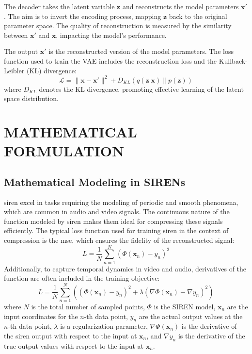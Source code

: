 \documentclass{ioereport}
\begin{document}
    The decoder takes the latent variable $\mathbf{z}$ and reconstructs the model parameters $\mathbf{x'}$. The aim is to invert the encoding process, mapping $\mathbf{z}$ back to the original parameter space. The quality of reconstruction is measured by the similarity between $\mathbf{x'}$ and $\mathbf{x}$, impacting the model's performance.

    The output $\mathbf{x'}$ is the reconstructed version of the model parameters. The loss function used to train the VAE includes the reconstruction loss and the Kullback-Leibler (KL) divergence:
    \begin{equation}
    \mathcal{L} = \|\mathbf{x} - \mathbf{x'}\|^2 + D_{KL}(q(\mathbf{z}|\mathbf{x}) \| p(\mathbf{z}))
    \end{equation}
    where $D_{KL}$ denotes the KL divergence, promoting effective learning of the latent space distribution.

\pagebreak



\section{\MakeUppercase{Mathematical Formulation}}

\subsection{Mathematical Modeling in SIRENs}
\gls{siren} excel in tasks requiring the modeling of periodic and smooth phenomena, which are common in audio and video signals. The continuous nature of the function modeled by \gls{siren} makes them ideal for compressing these signals efficiently. The typical loss function used for training \gls{siren} in the context of compression is the \gls{mse}, which ensures the fidelity of the reconstructed signal:
\begin{equation}
    L = \frac{1}{N} \sum_{n=1}^N (\Phi(\mathbf{x}_n) - y_n)^2 
\end{equation}
Additionally, to capture temporal dynamics in video and audio, derivatives of the function are often included in the training objective:
\begin{equation}
    L = \frac{1}{N} \sum_{n=1}^N \left((\Phi(\mathbf{x}_n) - y_n)^2 + \lambda (\nabla\Phi(\mathbf{x}_n) - \nabla y_n)^2\right) 
\end{equation}
where \( N \) is the total number of sampled points, \( \Phi \) is the SIREN model, \( \mathbf{x}_n \) are the input coordinates for the \(n\)-th data point, \( y_n \) are the actual output values at the \(n\)-th data point, \( \lambda \) is a regularization parameter, \( \nabla\Phi(\mathbf{x}_n) \) is the derivative of the \gls{siren} output with respect to the input at \( \mathbf{x}_n \), and \( \nabla y_n \) is the derivative of the true output values with respect to the input at \( \mathbf{x}_n \).
\end{document}
